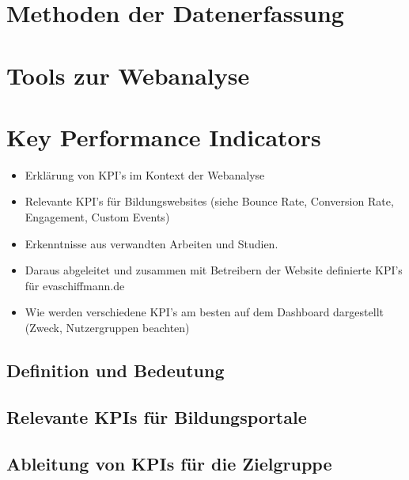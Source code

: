 \section{Methoden der Datenerfassung} %

\section{Tools zur Webanalyse} %























\section{Key Performance Indicators}
\begin{itemize}
\item Erklärung von KPI's im Kontext der Webanalyse
\item Relevante KPI's für Bildungswebsites (siehe Bounce Rate, Conversion Rate, Engagement, Custom Events)
\item Erkenntnisse aus verwandten Arbeiten und Studien.
\item Daraus abgeleitet und zusammen mit Betreibern der Website definierte KPI's für evaschiffmann.de
\item Wie werden verschiedene KPI's am besten auf dem Dashboard dargestellt (Zweck, Nutzergruppen beachten)
\end{itemize}
\subsection{Definition und Bedeutung}
\subsection{Relevante KPIs für Bildungsportale}
\subsection{Ableitung von KPIs für die Zielgruppe}












